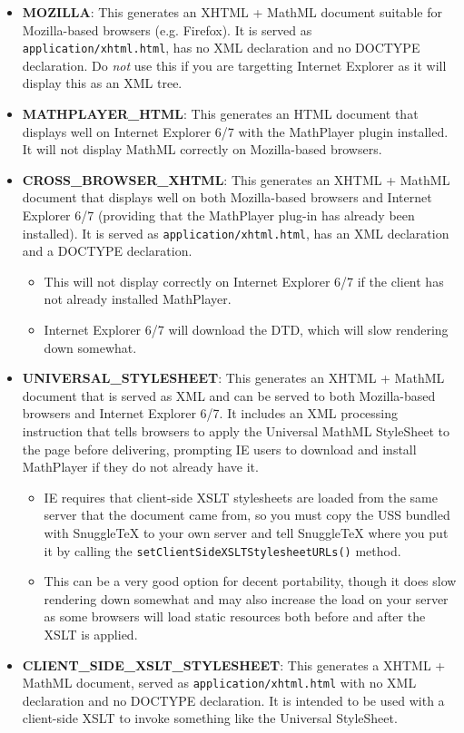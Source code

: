 \begin{itemize}
  \item \textbf{MOZILLA}: This generates an XHTML + MathML document suitable for
    Mozilla-based browsers (e.g. Firefox). It is served as \verb|application/xhtml.html|,
    has no XML declaration and no DOCTYPE declaration. Do \emph{not} use this if you
    are targetting Internet Explorer as it will display this as an XML tree.

  \item \textbf{MATHPLAYER\_HTML}: This generates an HTML document that displays well
    on Internet Explorer 6/7 with the MathPlayer plugin installed. It will not display
    MathML correctly on Mozilla-based browsers.

  \item \textbf{CROSS\_BROWSER\_XHTML}: This generates an XHTML + MathML document that
    displays well on both Mozilla-based browsers and Internet Explorer 6/7 (providing that
    the MathPlayer plug-in has already been installed). It is served as \verb|application/xhtml.html|,
    has an XML declaration and a DOCTYPE declaration.
    \begin{itemize}
      \item This will not display correctly on Internet Explorer 6/7 if the
        client has not already installed MathPlayer.
      \item Internet Explorer 6/7 will download the DTD, which will slow rendering down
        somewhat.
    \end{itemize}

  \item \textbf{UNIVERSAL\_STYLESHEET}: This generates an XHTML + MathML document
    that is served as XML and can be served to both Mozilla-based browsers and
    Internet Explorer 6/7. It includes an XML processing instruction that tells
    browsers to apply the Universal MathML StyleSheet to the page before delivering,
    prompting IE users to download and install MathPlayer if they do not already have it.
    \begin{itemize}
      \item IE requires that client-side XSLT stylesheets are loaded from the same server
        that the document came from, so you must copy the USS bundled with SnuggleTeX to
        your own server and tell SnuggleTeX where you put it by calling the
        \verb|setClientSideXSLTStylesheetURLs()| method.
      \item This can be a very good option for decent portability, though it does slow
        rendering down somewhat and may also increase the load on your server as some
        browsers will load static resources both before and after the XSLT is applied.
    \end{itemize}

  \item \textbf{CLIENT\_SIDE\_XSLT\_STYLESHEET}: This generates a XHTML + MathML document,
    served as \verb|application/xhtml.html| with no XML declaration and no DOCTYPE declaration.
    It is intended to be used with a client-side XSLT to invoke something like the
    Universal StyleSheet.

\end{itemize}

